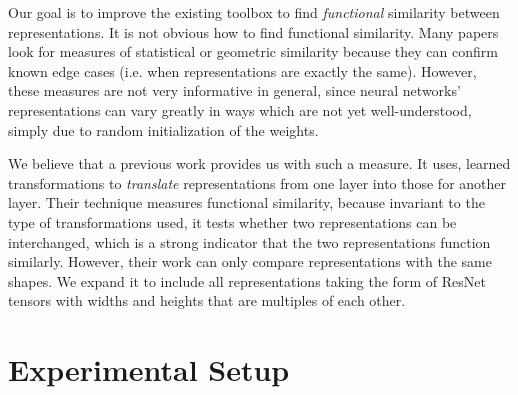\documentclass{article}
\begin{document}
Our goal is to improve the existing toolbox to find \textit{functional} similarity between representations.
It is not obvious how to find functional similarity.
Many papers \cite{Kornblith2019SimilarityON} \cite{Morcos2018InsightsOR} \cite{Ding2021GroundingRS}
look for measures of statistical or geometric similarity because they can confirm known edge cases (i.e. when
representations are exactly the same).
However, these measures are not very informative in general, since neural networks'
representations can vary greatly in ways which are not yet well-understood,
simply due to random initialization of the weights. 

We believe that a previous work \cite{Bansal2021RevisitingMS} provides us with such a measure. It uses,
learned transformations to \textit{translate} representations from one layer into those for another
layer. Their technique measures functional similarity, because invariant to the type of transformations used,
it tests whether two representations can be interchanged, which is a strong indicator that the two representations
function similarly. However, their work can only
compare representations with the same shapes.
We expand it to include all representations taking the form of
ResNet tensors with widths and heights that are multiples of each other.

\section{Experimental Setup}
\label{ExperimentalSetup}
\end{document}
